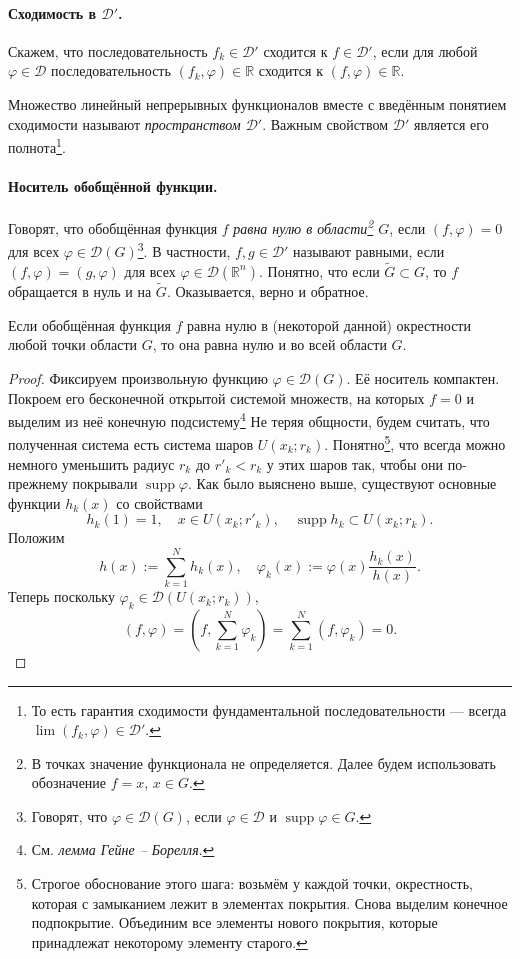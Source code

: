 \paragraph{Сходимость в $ \mathcal D' $.}
Скажем, что последовательность $ f_k \in \mathcal D' $ сходится к $ f \in
\mathcal D' $, если для любой $ \varphi \in \mathcal D $ последовательность $
(f_k, \varphi) \in \mathbb R$ сходится к $ (f, \varphi) \in \mathbb R $.

Множество линейный непрерывных функционалов вместе с введённым понятием
сходимости называют \emph{пространством $ \mathcal D' $}. Важным свойством $
\mathcal D' $ является его полнота\footnote{То есть гарантия сходимости
	фундаментальной последовательности --- всегда $ \lim(f_k, \varphi) \in \mathcal
	D'$.}.

\paragraph{Носитель обобщённой функции.} Говорят, что обобщённая функция $ f $
\emph{равна нулю в области\footnote{В точках значение функционала не
		определяется.
		Далее будем использовать обозначение $ f = x $, $ x\in G $.} $ G $}, если $ (f,\varphi)  = 0 $ для
всех $ \varphi
\in \mathcal D(G)$\footnote{Говорят, что $ \varphi \in\mathcal D(G) $, если $ \varphi \in \mathcal
	D$ и $ \operatorname{supp} \varphi \in G $.}. В частности, $ f, g \in \mathcal
D' $ называют равными, если $ (f,\varphi) = (g,\varphi) $ для всех $ \varphi \in
\mathcal D(\mathbb R^n)$. Понятно, что если $ \tilde G \subset G $, то $ f $
обращается в нуль и на $ \tilde G $. Оказывается, верно и обратное.

\begin{theorem} Если обобщённая функция $ f $ равна нулю в (некоторой данной) окрестности любой
	точки области $ G $, то она равна нулю и во всей области $ G $.
\end{theorem}
\begin{proof}
	Фиксируем произвольную функцию $ \varphi \in \mathcal D(G) $. Её носитель
	компактен. Покроем его бесконечной открытой системой множеств, на которых $ f =
	0$ и выделим из неё конечную подсистему\footnote{См. \emph{лемма Гейне --
			Борелля}.} Не теряя общности, будем считать, что полученная система есть система
	шаров $ U(x_k; r_k) $. Понятно\footnote{Строгое обоснование этого шага: возьмём
		у каждой точки, окрестность, которая с замыканием лежит в элементах покрытия.
		Снова выделим конечное подпокрытие. Объединим все элементы нового покрытия,
		которые принадлежат некоторому элементу старого.}, что всегда можно немного уменьшить радиус $ r_k
	$ до $ r'_k < r_k $ у этих шаров так, чтобы они по-прежнему покрывали $ \operatorname{supp}\varphi
	$. Как было выяснено выше, существуют основные функции $ h_k(x) $ со
	свойствами 
	\[
	h_k(1) = 1, \quad x \in U(x_k; r'_k), \quad \operatorname{supp}h_k \subset
	U(x_k; r_k).
	\]
	Положим  
	\[
	h(x) := \sum_{k=1}^N h_k(x), \quad \varphi_k(x) := \varphi(x)
	\frac{h_k(x)}{h(x)}.
	\]
	Теперь поскольку $ \varphi_k \in \mathcal D(U(x_k; r_k)) $, 
	\[
	(f,\varphi) = \left(f, \sum_{k=1}^N \varphi_k\right) =
	\sum_{k=1}^N(f,\varphi_k) = 0.
	\]
\end{proof}

